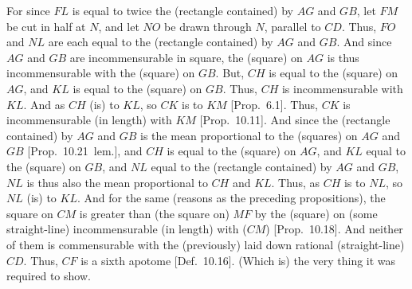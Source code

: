 \begin{Parallel}{}{}
{For since $FL$ is equal to twice the (rectangle contained) by $AG$
and $GB$, let $FM$ be cut in half at $N$, and let $NO$
be drawn through $N$, parallel to $CD$. Thus, $FO$ and $NL$
are each equal to the (rectangle contained) by $AG$ and $GB$. And since
$AG$ and $GB$ are incommensurable in square, the (square) on $AG$
is thus incommensurable with the (square) on $GB$. But, $CH$ is equal to
the (square) on $AG$, and $KL$ is equal to the (square) on $GB$. 
Thus, $CH$ is incommensurable with $KL$. And as $CH$ (is) to
$KL$, so $CK$ is to $KM$ [Prop.~6.1].  Thus,
$CK$ is incommensurable (in length) with $KM$ [Prop.~10.11]. And since the (rectangle contained)
by $AG$ and $GB$ is the mean proportional to the (squares) on 
$AG$ and $GB$ [Prop.~10.21~lem.], and $CH$ is equal to the (square) on $AG$, and $KL$ 
equal to the (square) on $GB$, and $NL$ equal to the (rectangle contained)
by $AG$ and $GB$, $NL$ is thus also the mean proportional to
$CH$ and $KL$. Thus, as $CH$ is to $NL$, so $NL$ (is) to $KL$.
And for the same (reasons as the preceding propositions), the square on 
$CM$ is greater than (the square on) $MF$ by the (square) on (some
straight-line) incommensurable (in length) with ($CM$) [Prop.~10.18]. And neither
of them is commensurable with the (previously) laid down rational 
(straight-line) $CD$. Thus, $CF$ is a sixth apotome 
[Def.~10.16]. (Which is) the very thing it was required to show.\\}
\end{Parallel}

